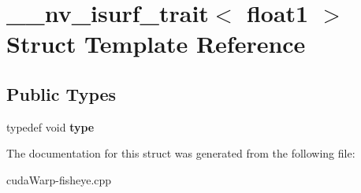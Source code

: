 \hypertarget{struct____nv__isurf__trait_3_01float1_01_4}{}\section{\+\_\+\+\_\+nv\+\_\+isurf\+\_\+trait$<$ float1 $>$ Struct Template Reference}
\label{struct____nv__isurf__trait_3_01float1_01_4}
\subsection*{Public Types}
\begin{DoxyCompactItemize}
\item 
typedef void {\bfseries type}\hypertarget{struct____nv__isurf__trait_3_01float1_01_4_aaa9bf666c280fa57b441c23a7881b19f}{}\label{struct____nv__isurf__trait_3_01float1_01_4_aaa9bf666c280fa57b441c23a7881b19f}

\end{DoxyCompactItemize}


The documentation for this struct was generated from the following file\+:\begin{DoxyCompactItemize}
\item 
cuda\+Warp-\/fisheye.\+cpp\end{DoxyCompactItemize}
